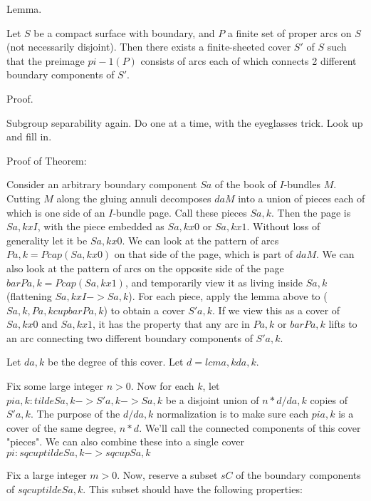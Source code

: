 \documentclass[12pt]{amsart}
\theoremstyle{definition}
\theoremstyle{remark}
\begin{document}
Lemma.

Let $S$ be a compact surface with boundary, and $P$ a finite set of proper arcs
on $S$ (not necessarily disjoint).  Then there exists a finite-sheeted cover
$S'$ of $S$ such that the preimage $pi-1(P)$ consists of arcs each of which
connects 2 different boundary components of $S'$.

Proof.

Subgroup separability again. Do one at a time, with the eyeglasses trick.  Look
up and fill in.

Proof of Theorem:


Consider an arbitrary boundary component $Sa$ of the book of $I$-bundles $M$.
Cutting $M$ along the gluing annuli decomposes $daM$ into a union of pieces
each of which is one side of an $I$-bundle page. Call these pieces $Sa,k$. Then
the page is $Sa,kxI$, with the piece embedded as $Sa,kx0$ or $Sa,kx1$. Without
loss of generality let it be $Sa,kx0$. We can look at the pattern of arcs $Pa,k
= P cap (Sa,kx0)$ on that side of the page, which is part of $daM$. We can also
look at the pattern of arcs on the opposite side of the page $barPa,k = P cap
(Sa,kx1)$, and temporarily view it as living inside $Sa,k$ (flattening $Sa,kxI
-> Sa,k$).  For each piece, apply the lemma above to ($Sa,k,Pa,k cup barPa,k$)
to obtain a cover $S'a,k$. If we view this as a cover of $Sa,kx0$ and $Sa,kx1$,
it has the property that any arc in $Pa,k$ or $barPa,k$ lifts to an arc
connecting two different boundary components of $S'a,k$.

Let $da,k$ be the degree of this cover. Let $d = lcm a,k da,k$.

Fix some large integer $n>0$. Now for each $k$, let $pia,k : tildeSa,k -> S'a,k
-> Sa,k$ be a disjoint union of $n*d/da,k$ copies of $S'a,k$. The purpose of
the $d/da,k$ normalization is to make sure each $pia,k$ is a cover of the same
degree, $n*d$.  We'll call the connected components of this cover "pieces". We
can also combine these into a single cover $pi : sqcup tildeSa,k -> sqcup Sa,k$

Fix a large integer $m>0$. Now, reserve a subset $sC$ of the boundary
components of $sqcup tildeSa,k$.  This subset should have the following
properties:
\end{document}
